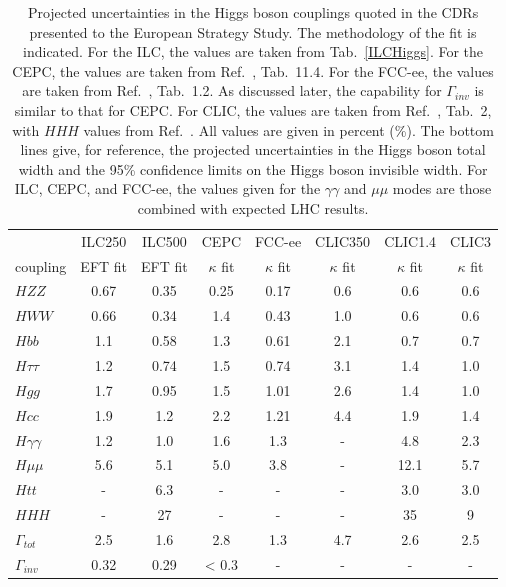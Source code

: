 \begin{table}[!htbp]
\begin{center}
\begin{tabular}{l|cc|c|c|ccc}
    &  ILC250      &   ILC500   & CEPC &  FCC-ee &
   CLIC350 & 
   CLIC1.4 & CLIC3 \\ 
coupling &   EFT fit & EFT fit & $\kappa$ fit &  $\kappa$ fit &
              $\kappa$   fit &   $\kappa$   fit &
   $\kappa$ fit  \\ \hline 
$HZZ$            &             0.67&   0.35    &   0.25   & 0.17     &  0.6     &     0.6    &   0.6     \\ 
$HWW$            &         0.66  &   0.34   &   1.4   &   0.43   &   1.0    &   0.6  &  0.6 \\ 
 $Hbb$            &              1.1  &  0.58   &  1.3    &    0.61  &   2.1    &  0.7  &  0.7 \\ 
$H\tau\tau$    &          1.2  &   0.74   &   1.5   &  0.74    &   3.1    &  1.4  &  1.0 \\ 
$Hgg$ &                      1.7  & 0.95       &  1.5    &  1.01    &   2.6    &   1.4   &  1.0  \\ 
$Hcc$                       &   1.9  &  1.2   &   2.2   &   1.21   &    4.4   &  1.9  &  1.4 \\ 
$H\gamma\gamma$ &  1.2 &   1.0     &  1.6    &   1.3   &    -   &  4.8  &  2.3 \\ 
$H\mu\mu$                &  5.6  &  5.1     &  5.0    &  3.8    &    -
& 12.1 &  5.7 \\ 
$Htt$  &                       -     &      6.3     &  -    &  -    &
-    & 3.0  &  3.0  \\ 
$HHH$                         &  -    &   27     &   -   &   -   &   -
& 35 &  9 \\ \hline 
$\Gamma_{tot}$             & 2.5  & 1.6    &   2.8    &  1.3     &
4.7    & 2.6  & 2.5 \\  
$\Gamma_{inv}$          &   0.32  & 0.29    &  < 0.3    &   -   &   -
& -  & - \\  \hline
\end{tabular}
\end{center}
\caption{ \label{tab:askthem}    Projected uncertainties in the Higgs
  boson couplings quoted in the CDRs presented to the European
  Strategy Study.  The methodology of the fit is indicated. 
 For the ILC, the  values are taken from
  Tab.~\ref{ILCHiggs}.    For the CEPC, the values are taken from
  Ref.~\cite{CEPCStudyGroup:2018ghi}, Tab.~11.4.  For the FCC-ee, the values are taken
  from Ref.~\cite{Benedikt:2018qee}, Tab.~1.2. As discussed later,
  the capability for $\Gamma_{inv}$  is similar to that for CEPC. 
 For CLIC, the values are taken from 
Ref.~\cite{Charles:2018vfv}, Tab.~2, with $HHH$ values from
Ref.~\cite{Roloff:2019crr}.
  All values
  are given in percent (\%). The
  bottom lines give, for reference, the projected uncertainties in the
  Higgs boson total width and the 95\% confidence limits on the Higgs
  boson invisible width.  For  ILC, CEPC, and FCC-ee, the 
 values given for the $\gamma\gamma$ and $\mu\mu$ modes are those
 combined with expected
LHC results.}
\end{table}



